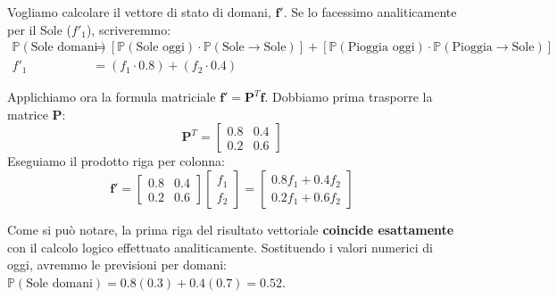 Vogliamo calcolare il vettore di stato di domani, $\mathbf{f}'$.
Se lo facessimo analiticamente per il Sole ($f'_1$), scriveremmo:
\begin{align*}
    \mathbb{P}(\text{Sole domani}) &= \left[ \mathbb{P}(\text{Sole oggi}) \cdot \mathbb{P}(\text{Sole} \to \text{Sole}) \right] + \left[ \mathbb{P}(\text{Pioggia oggi}) \cdot \mathbb{P}(\text{Pioggia} \to \text{Sole}) \right] \\
    f'_1 &= (f_1 \cdot 0.8) + (f_2 \cdot 0.4)
\end{align*}

Applichiamo ora la formula matriciale $\mathbf{f}' = \mathbf{P}^T \mathbf{f}$. Dobbiamo prima trasporre la matrice $\mathbf{P}$:
\begin{equation*}
    \mathbf{P}^T = \begin{bmatrix} 0.8 & 0.4 \\ 0.2 & 0.6 \end{bmatrix}
\end{equation*}
Eseguiamo il prodotto riga per colonna:
\begin{equation*}
    \mathbf{f}' = \begin{bmatrix} 0.8 & 0.4 \\ 0.2 & 0.6 \end{bmatrix} \begin{bmatrix} f_1 \\ f_2 \end{bmatrix} = \begin{bmatrix} 0.8 f_1 + 0.4 f_2 \\ 0.2 f_1 + 0.6 f_2 \end{bmatrix}
\end{equation*}

Come si può notare, la prima riga del risultato vettoriale \textbf{coincide esattamente} con il calcolo logico effettuato analiticamente. Sostituendo i valori numerici di oggi, avremmo le previsioni per domani: $\mathbb{P}(\text{Sole domani}) = 0.8(0.3) + 0.4(0.7) = 0.52$.
